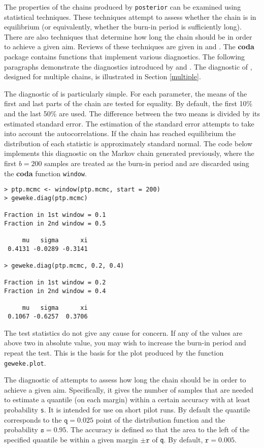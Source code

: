 \documentclass[11pt,a4paper]{article}
\begin{document}
The properties of the chains produced by \verb+posterior+ can be
examined using statistical techniques.  These techniques attempt to
assess whether the chain is in equilibrium (or equivalently, whether
the burn-in period is sufficiently long).  There are also techniques
that determine how long the chain should be in order to achieve a
given aim.  Reviews of these techniques are given in
\citet{cowlcarl96} and \citet{broorobe98}.  The \textbf{coda} package
contains functions that implement various diagnostics.  The following
paragraphs demonstrate the diagnostics introduced by \citet{gewe92}
and \citet{raftlewi92}.  The diagnostic of \citet{gelmrubi92},
designed for multiple chains, is illustrated in Section
\ref{multiple}.

The diagnostic of \citet{gewe92} is particularly simple.  For each
parameter, the means of the first and last parts of the chain are
tested for equality.  By default, the first 10\% and the last 50\% are
used.  The difference between the two means is divided by its
estimated standard error.  The estimation of the standard error
attempts to take into account the autocorrelations.  If the chain has
reached equilibrium the distribution of each statistic is
approximately standard normal.  The code below implements this
diagnostic on the Markov chain generated previously, where the first
$b=200$ samples are treated as the burn-in period and are discarded
using the \textbf{coda} function \verb+window+.

\begin{verbatim}
> ptp.mcmc <- window(ptp.mcmc, start = 200)
> geweke.diag(ptp.mcmc)

Fraction in 1st window = 0.1
Fraction in 2nd window = 0.5 

     mu   sigma      xi 
 0.4131 -0.0289 -0.3141 

> geweke.diag(ptp.mcmc, 0.2, 0.4)

Fraction in 1st window = 0.2
Fraction in 2nd window = 0.4 

     mu   sigma      xi 
 0.1067 -0.6257  0.3706 
\end{verbatim}

The test statistics do not give any cause for concern.  If any of the
values are above two in absolute value, you may wish to increase the
burn-in period and repeat the test.  This is the basis for the plot
produced by the function \verb+geweke.plot+.

The diagnostic of \citet{raftlewi92} attempts to assess how long the
chain should be in order to achieve a given aim.  Specifically, it
gives the number of samples that are needed to estimate a quantile (on
each margin) within a certain accuracy with at least probability
\verb+s+.  It is intended for use on short pilot runs.  By default the
quantile corresponds to the $\texttt{q} = 0.025$ point of the
distribution function and the probability $\texttt{s} = 0.95$.  The
accuracy is defined so that the area to the left of the specified
quantile be within a given margin $\pm \texttt{r}$ of \verb+q+.  By
default, $\texttt{r} = 0.005$.
   
\end{document}
